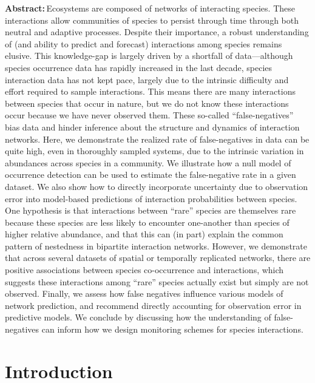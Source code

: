 \documentclass[11pt]{article}
\begin{document}
        {\bfseries Abstract:}\,Ecosystems are composed of networks of
interacting species. These interactions allow communities of species to
persist through time through both neutral and adaptive processes.
Despite their importance, a robust understanding of (and ability to
predict and forecast) interactions among species remains elusive. This
knowledge-gap is largely driven by a shortfall of data---although
species occurrence data has rapidly increased in the last decade,
species interaction data has not kept pace, largely due to the intrinsic
difficulty and effort required to sample interactions. This means there
are many interactions between species that occur in nature, but we do
not know these interactions occur because we have never observed them.
These so-called ``false-negatives'' bias data and hinder inference about
the structure and dynamics of interaction networks. Here, we demonstrate
the realized rate of false-negatives in data can be quite high, even in
thoroughly sampled systems, due to the intrinsic variation in abundances
across species in a community. We illustrate how a null model of
occurrence detection can be used to estimate the false-negative rate in
a given dataset. We also show how to directly incorporate uncertainty
due to observation error into model-based predictions of interaction
probabilities between species. One hypothesis is that interactions
between ``rare'' species are themselves rare because these species are
less likely to encounter one-another than species of higher relative
abundance, and that this can (in part) explain the common pattern of
nestedness in bipartite interaction networks. However, we demonstrate
that across several datasets of spatial or temporally replicated
networks, there are positive associations between species co-occurrence
and interactions, which suggests these interactions among ``rare''
species actually exist but simply are not observed. Finally, we assess
how false negatives influence various models of network prediction, and
recommend directly accounting for observation error in predictive
models. We conclude by discussing how the understanding of
false-negatives can inform how we design monitoring schemes for species
interactions.\\%
    
\vfill

\clearpage
\linenumbers
\pagestyle{normal}

\hypertarget{introduction}{%
\section{Introduction}\label{introduction}}
\end{document}
